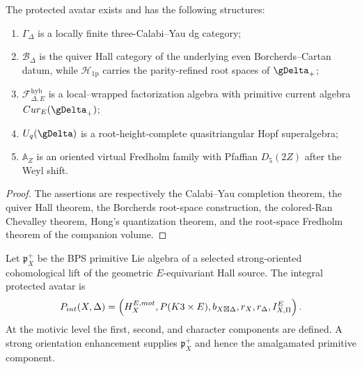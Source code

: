 \begin{theorem}
The protected avatar exists and has the following structures:
\begin{enumerate}
\item $\Gamma_\Delta$ is a locally finite three-Calabi--Yau dg category;
\item $\mathcal B_\Delta$ is the quiver Hall category of the underlying even Borcherds--Cartan datum, while $\mathcal H_{\mathrm{1p}}$ carries the parity-refined root spaces of $\gDelta_+$;
\item $\mathcal F^{\mathrm{hyb}}_{\Delta,E}$ is a local--wrapped factorization algebra with primitive current algebra $\Cur_E(\gDelta_+)$;
\item $\widehat U_q(\gDelta)$ is a root-height-complete quasitriangular Hopf superalgebra;
\item $\mathbb A_Z$ is an oriented virtual Fredholm family with Pfaffian $D_5(2Z)$ after the Weyl shift.
\end{enumerate}
\end{theorem}
\begin{proof}
The assertions are respectively the Calabi--Yau completion theorem, the quiver Hall theorem, the Borcherds root-space construction, the colored-Ran Chevalley theorem, Hong's quantization theorem, and the root-space Fredholm theorem of the companion volume.
\end{proof}

\begin{definition}
Let $\mathfrak p_X^+$ be the BPS primitive Lie algebra of a selected strong-oriented cohomological lift of the geometric $E$-equivariant Hall source.  The integral protected avatar is
\[
 P_{int}(X,\Delta)
 =\left(
   H_X^{E,mot},
   P(K3\times E),
   b_{X\boxtimes\Delta},
   r_X,r_\Delta,
   I_{X,\Pi}^E
 \right).
\]
At the motivic level the first, second, and character components are defined.  A strong orientation enhancement supplies $\mathfrak p_X^+$ and hence the amalgamated primitive component.
\end{definition}

